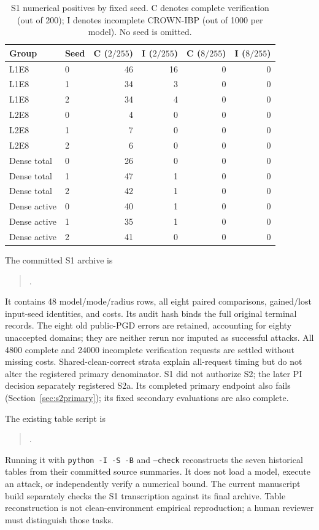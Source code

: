 \begin{table}[ht]
\centering\small
\caption{S1 numerical positives by fixed seed. C denotes complete verification (out of 200); I denotes incomplete CROWN-IBP (out of 1000 per model). No seed is omitted.}
\label{tab:s1seeds}
\begin{tabular}{llrrrr}
\toprule
Group & Seed & C ($2/255$) & I ($2/255$) & C ($8/255$) & I ($8/255$) \\
\midrule
L1E8 & 0 & 46 & 16 & 0 & 0 \\
L1E8 & 1 & 34 & 3 & 0 & 0 \\
L1E8 & 2 & 34 & 4 & 0 & 0 \\
L2E8 & 0 & 4 & 0 & 0 & 0 \\
L2E8 & 1 & 7 & 0 & 0 & 0 \\
L2E8 & 2 & 6 & 0 & 0 & 0 \\
Dense total & 0 & 26 & 0 & 0 & 0 \\
Dense total & 1 & 47 & 1 & 0 & 0 \\
Dense total & 2 & 42 & 1 & 0 & 0 \\
Dense active & 0 & 40 & 1 & 0 & 0 \\
Dense active & 1 & 35 & 1 & 0 & 0 \\
Dense active & 2 & 41 & 0 & 0 & 0 \\
\bottomrule
\end{tabular}
\end{table}

The committed S1 archive is
\begin{quote}\small
{}.
\end{quote}
It contains 48 model/mode/radius rows, all eight paired comparisons, gained/lost input-seed
identities, and costs. Its audit hash binds the full original terminal records.
The eight old public-PGD errors are retained, accounting for eighty unaccepted
domains; they are neither rerun nor imputed as successful attacks. All 4800
complete and 24000 incomplete verification requests are settled without missing
costs. Shared-clean-correct strata explain all-request timing but do not alter
the registered primary denominator. S1 did not authorize S2; the later PI
decision separately registered S2a. Its completed primary endpoint also fails
(Section~\ref{sec:s2primary}); its fixed secondary evaluations are also complete.

The existing table script is
\begin{quote}\small
{}.
\end{quote}
Running it with \texttt{python -I -S -B} and \texttt{--check} reconstructs the
seven historical tables from their committed source summaries.
It does not load a model, execute an attack, or independently verify a numerical
bound. The current manuscript build separately checks the S1 transcription
against its final archive. Table reconstruction is not clean-environment
empirical reproduction; a human reviewer must distinguish those tasks.

